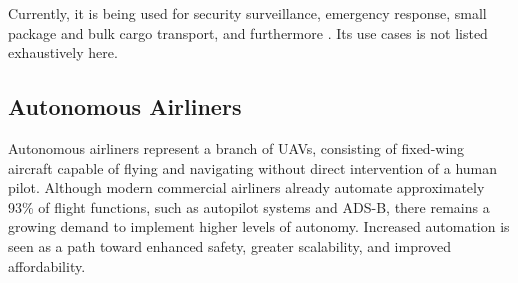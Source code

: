 Currently, it is being used for security surveillance, emergency response, small package and bulk cargo transport, and furthermore \cite{skybrary_uas}. 
Its use cases is not listed exhaustively here. 



\subsection{Autonomous Airliners}

Autonomous airliners represent a branch of \glspl{UAV}, consisting of fixed-wing aircraft capable of flying and navigating without direct intervention of a human pilot.
Although modern commercial airliners already automate approximately 93\% of flight functions, such as autopilot systems and \gls{ADS-B}, there remains a growing demand to implement higher levels of autonomy.
Increased automation is seen as a path toward enhanced safety, greater scalability, and improved affordability.



